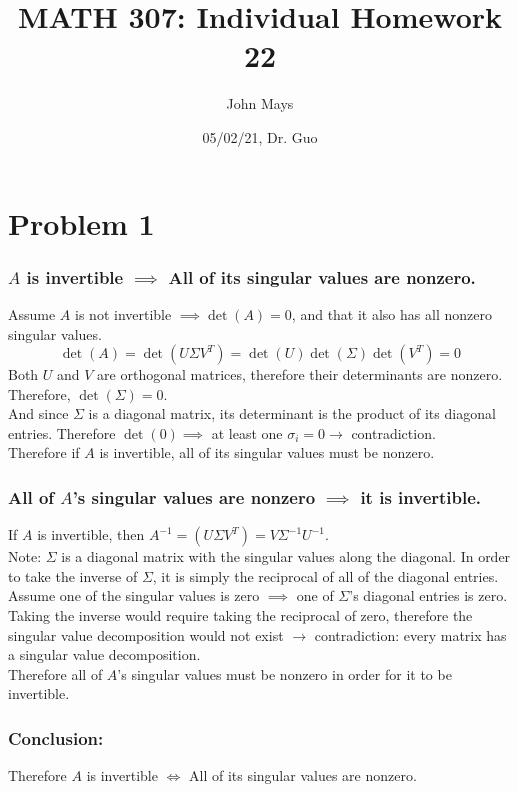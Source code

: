 \documentclass[fleqn]{article}
\title{\textbf{MATH 307: Individual Homework 22}}
\author{John Mays}
\date{05/02/21, Dr. Guo}
\begin{document}
\maketitle

\section*{Problem 1}
\subsubsection*{$A$ is invertible $\implies$ All of its singular values are nonzero.}
Assume $A$ is not invertible $\implies \det(A) = 0$, and that it also has all nonzero singular values.\\
$$\det(A)=\det(U\Sigma V^{T})= \det(U)\det(\Sigma )\det(V^{T})=0$$
Both $U$ and $V$ are orthogonal matrices, therefore their determinants are nonzero.  Therefore, $\det(\Sigma) = 0$.\\
And since $\Sigma$ is a diagonal matrix, its determinant is the product of its diagonal entries.  Therefore $\det(0) \implies $ at least one $\sigma_i = 0 \rightarrow$ contradiction.\\
\linebreak
Therefore if $A$ is invertible, all of its singular values must be nonzero.
\subsubsection*{All of $A$'s singular values are nonzero $\implies$ it is invertible.}
If $A$ is invertible, then $A^{-1} = (U\Sigma V^{T}) = V \Sigma^{-1} U^{-1}$.\\
Note: $\Sigma$ is a diagonal matrix with the singular values along the diagonal.  In order to take the inverse of $\Sigma$, it is simply the reciprocal of all of the diagonal entries.\\
\linebreak
Assume one of the singular values is zero $\implies$ one of $\Sigma$'s diagonal entries is zero.  Taking the inverse would require taking the reciprocal of zero, therefore the singular value decomposition would not exist $\rightarrow$ contradiction: every matrix has a singular value decomposition.\\
\linebreak
Therefore all of $A$'s singular values must be nonzero in order for it to be\\ invertible.
\subsubsection*{Conclusion:}
Therefore $A$ is invertible $\iff$ All of its singular values are nonzero.
\pagebreak
\end{document}
